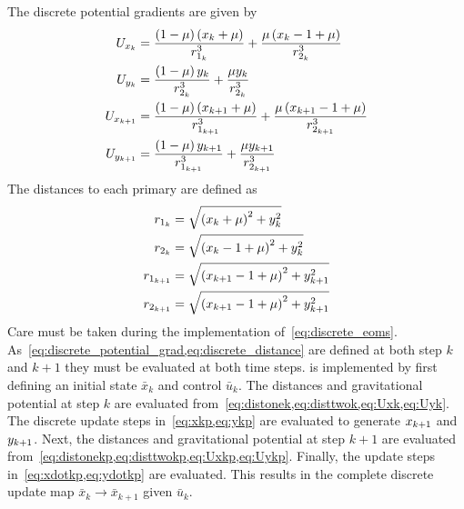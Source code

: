 \documentclass[letterpaper, preprint, paper,11pt]{AAS}	%
\begin{document}
The discrete potential gradients are given by
\begin{subequations}\label{eq:discrete_potential_grad}
\begin{align}
	U_{\xk} &= \frac{\parenth{1 -\mu} \parenth{\xk + \mu}}{\distonek^3} + \frac{ \mu \parenth{\xk -1 + \mu}}{\disttwok^3} \label{eq:Uxk}\\
	U_{\yk} &= \frac{\parenth{1 -\mu} \yk}{\disttwok^3} + \frac{ \mu \yk}{\disttwok^3} \label{eq:Uyk} \\
	U_{\xkp} &= \frac{\parenth{1 -\mu} \parenth{\xkp + \mu}}{\distonekp^3} + \frac{ \mu \parenth{\xkp -1 + \mu}}{\disttwokp^3} \label{eq:Uxkp}\\
	U_{\ykp} &= \frac{\parenth{1 -\mu} \ykp}{\distonekp^3} + \frac{ \mu \ykp}{\disttwokp^3} \label{eq:Uykp}
\end{align}	
\end{subequations}
The distances to each primary are defined as
\begin{subequations}\label{eq:discrete_distance}
\begin{align}
	\distonek &= \sqrt{\left( \xk + \mu\right)^2 + \yk^2} \label{eq:distonek}\\
	\disttwok &= \sqrt{\left( \xk - 1 + \mu\right)^2 + \yk^2} \label{eq:disttwok}\\
	\distonekp &= \sqrt{\left( \xkp - 1 + \mu\right)^2 + \ykp^2} \label{eq:distonekp}\\
	\disttwokp &= \sqrt{\left( \xkp - 1 + \mu\right)^2 + \ykp^2} \label{eq:disttwokp}
\end{align}
\end{subequations}
Care must be taken during the implementation of~\cref{eq:discrete_eoms}.
As~\cref{eq:discrete_potential_grad,eq:discrete_distance} are defined at both step \( k \) and \( k+1 \) they must be evaluated at both time steps.
 is implemented by first defining an initial state \( \bar{x}_k \) and control \( \bar{u}_k \).
The distances and gravitational potential at step \( k \) are evaluated from~\cref{eq:distonek,eq:disttwok,eq:Uxk,eq:Uyk}.
The discrete update steps in~\cref{eq:xkp,eq:ykp} are evaluated to generate \( x_{k+1} \) and \( y_{k+1}\).
Next, the distances and gravitational potential at step \( k+1 \) are evaluated from~\cref{eq:distonekp,eq:disttwokp,eq:Uxkp,eq:Uykp}. 
Finally, the update steps in~\cref{eq:xdotkp,eq:ydotkp} are evaluated.
This results in the complete discrete update map \( \bar{x}_k \to \bar{x}_{k+1} \) given \( \bar{u}_k \).
\end{document}

